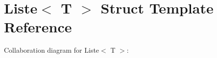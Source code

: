 \hypertarget{structListe}{}\section{Liste$<$ T $>$ Struct Template Reference}
\label{structListe}


Collaboration diagram for Liste$<$ T $>$\+:
